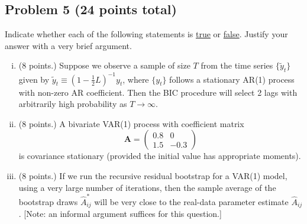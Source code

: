 \documentclass[12pt]{article}
\begin{document}
\subsection*{Problem 5 (24 points total)}
Indicate whether each of the following statements is \underline{true} or \underline{false}. Justify your answer with a very brief argument.

\begin{enumerate}[i)]
\item (8 points.) Suppose we observe a sample of size $T$ from the time series $\lbrace \tilde{y}_t \rbrace$ given by $\tilde{y}_t \equiv (1-\tfrac{1}{2}L)^{-1}y_t$, where $\lbrace y_t \rbrace$ follows a stationary AR(1) process with non-zero AR coefficient. Then the BIC procedure will select 2 lags with arbitrarily high probability as $T \to \infty$.

\item (8 points.) A bivariate VAR(1) process with coefficient matrix
\[\bm{A} = \begin{pmatrix}
0.8 & 0 \\
1.5 & -0.3
\end{pmatrix}\]
is covariance stationary (provided the initial value has appropriate moments).

\item (8 points.) If we run the recursive residual bootstrap for a VAR(1) model, using a very large number of iterations, then the sample average of the bootstrap draws $\hat{A}_{ij}^*$ will be very close to the real-data parameter estimate $\hat{A}_{ij}$. [Note: an informal argument suffices for this question.]
\end{enumerate}
\end{document}
